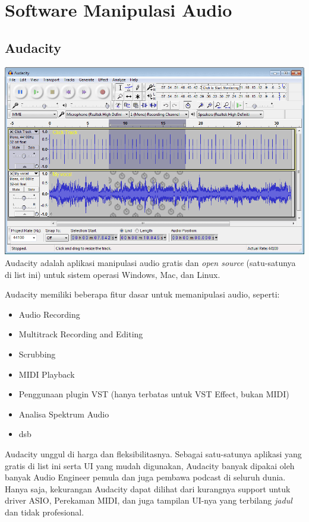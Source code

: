 \documentclass[12pt,a4paper]{report}
\begin{document}
  \section*{Software Manipulasi Audio}\label{software-manipulasi-audio}

  \subsection*{Audacity}\label{audacity}

  \includegraphics[width=\textwidth]{images/audacity.png}
  Audacity adalah aplikasi manipulasi audio gratis dan \emph{open source} (satu-satunya di list
  ini) untuk sistem operasi Windows, Mac, dan Linux.

  Audacity memiliki beberapa fitur dasar untuk memanipulasi audio,
  seperti:

  \begin{itemize}
  \item
    Audio Recording
  \item
    Multitrack Recording and Editing
  \item
    Scrubbing
  \item
    MIDI Playback
  \item
    Penggunaan plugin VST (hanya terbatas untuk VST Effect, bukan MIDI)
  \item
    Analisa Spektrum Audio
  \item
    dsb
  \end{itemize}

  Audacity unggul di harga dan fleksibilitasnya. Sebagai satu-satunya
  aplikasi yang gratis di list ini serta UI yang mudah digunakan, Audacity
  banyak dipakai oleh banyak Audio Engineer pemula dan juga pembawa
  podcast di seluruh dunia. Hanya saja, kekurangan Audacity dapat dilihat
  dari kurangnya support untuk driver ASIO, Perekaman MIDI, dan juga
  tampilan UI-nya yang terbilang \emph{jadul} dan tidak profesional.
\end{document}
